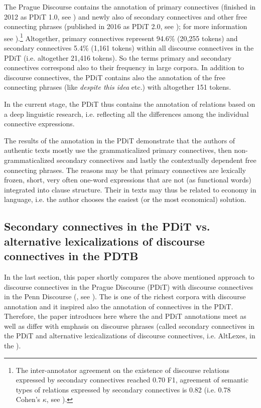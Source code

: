 \documentclass[output=paper]{langsci/langscibook.cls}
\begin{document}
The Prague Discourse  contains the annotation of primary connectives (finished in 2012 as PDiT 1.0, see \citealt{biblio:PoJiPragueDiscourse2012}) and newly also of secondary connectives and other free connecting phrases (published in 2016 as PDiT 2.0, see \citealt{biblio:RySyPragueDiscourse2016}); for more information see \citealt{biblio:RyRyCentreand2014}).\footnote{ The inter-annotator agreement on the existence of discourse relations expressed by secondary connectives reached 0.70 F1, agreement of semantic types of relations expressed by secondary connectives is 0.82 (i.e. 0.78 Cohen’s $\kappa $, see \citealt{biblio:RyRySecondaryConnectives2015}).} Altogether, primary connectives represent 94.6\% (20,255 tokens) and secondary connectives 5.4\% (1,161 tokens) within all discourse connectives in the PDiT (i.e. altogether 21,416 tokens). So the terms primary and secondary connectives correspond also to their frequency in large corpora. In addition to discourse connectives, the PDiT contains also the annotation of the free connecting phrases (like \textit{despite this idea} etc.) with altogether 151 tokens. 


In the current stage, the PDiT thus contains the annotation of  relations based on a deep linguistic research, i.e. reflecting all the differences among the individual connective expressions. 


The results of the annotation in the PDiT demonstrate that the authors of authentic texts mostly use the grammaticalized primary connectives, then non-grammaticalized secondary connectives and lastly the contextually dependent free connecting phrases. The reasons may be that primary connectives are lexically frozen, short, very often one-word expressions that are not (as functional words) integrated into clause structure. Their  in texts may thus be related to economy in language, i.e. the author chooses the easiest (or the most economical) solution.



\subsection{Secondary connectives in the PDiT vs. alternative lexicalizations of discourse connectives in the PDTB}


In the last section, this paper shortly compares the above mentioned approach to discourse connectives in the Prague Discourse  (PDiT) with discourse connectives in the Penn Discourse  (, see \citealt{prasad2014reflections}). The  is one of the richest corpora with discourse annotation and it inspired also the annotation of connectives in the PDiT. Therefore, the paper introduces here where the  and PDiT annotations meet as well as differ with emphasis on  discourse phrases (called secondary connectives in the PDiT and alternative lexicalizations of discourse connectives, i.e. AltLexes, in the ). 
\end{document}
